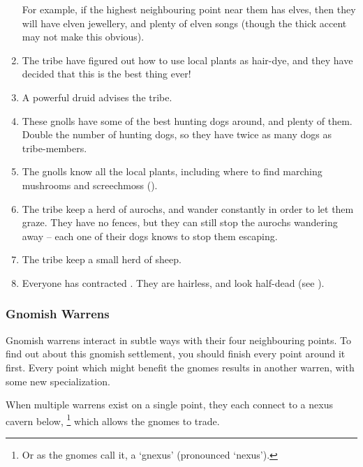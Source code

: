 \begin{multicols}{2}
\begin{enumerate}
  For example, if the highest neighbouring point near them has elves, then they will have elven jewellery, and plenty of elven songs (though the thick accent may not make this obvious).
  \item
  The tribe have figured out how to use local plants as hair-dye, and they have decided that this is the best thing ever!
  \item
  A powerful druid advises the tribe.
  \item
  These gnolls have some of the best hunting dogs around, and plenty of them.
  Double the number of hunting dogs, so they have twice as many dogs as tribe-members.
  \item
  The gnolls know all the local plants, including where to find marching mushrooms and screechmoss ().
  \item
  The tribe keep a herd of aurochs, and wander constantly in order to let them graze.
  They have no fences, but they can still stop the aurochs wandering away -- each one of their dogs knows to stop them escaping.
  \item
  The tribe keep a small herd of sheep.
  \item
  Everyone has contracted .
  They are hairless, and look half-dead
  (see ).
\end{enumerate}

\subsubsection{Gnomish Warrens}
\label{gnomePoint}

Gnomish warrens interact in subtle ways with their four neighbouring points.
To find out about this gnomish settlement, you should finish every point around it first.
Every point which might benefit the gnomes results in another warren, with some new specialization.

When multiple warrens exist on a single point, they each connect to a nexus cavern below,%
\footnote{Or as the gnomes call it, a `gnexus' (pronounced `nexus').}
which allows the gnomes to trade.


\end{multicols}
